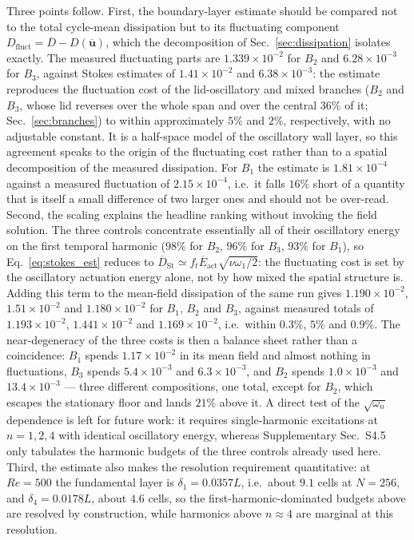 \documentclass[11pt,a4paper]{article}
\newcommand{\Dbar}{\overline{D}}
\begin{document}
Three points follow. First, the boundary-layer estimate should be compared not to
the total cycle-mean dissipation but to its fluctuating component
$D_{\mathrm{fluct}}=\Dbar-D(\overline{\mathbf{u}})$, which the decomposition of
Sec.~\ref{sec:dissipation} isolates exactly. The measured fluctuating parts are
$1.339\times10^{-2}$ for $B_2$ and $6.28\times10^{-3}$ for $B_3$, against Stokes
estimates of $1.41\times10^{-2}$ and $6.38\times10^{-3}$: the estimate reproduces
the fluctuation cost of the lid-oscillatory and mixed branches ($B_2$ and $B_3$,
whose lid reverses over the whole span and over the central $36\%$ of it;
Sec.~\ref{sec:branches}) to within approximately $5\%$ and $2\%$, respectively,
with no adjustable constant. It is a half-space
model of the oscillatory wall layer, so this agreement speaks to the origin of the
fluctuating cost rather than to a spatial decomposition of the measured
dissipation. For $B_1$ the estimate is
$1.81\times10^{-4}$ against a measured fluctuation of $2.15\times10^{-4}$, i.e.\ it
falls $16\%$ short of a quantity that is itself a small difference of two larger
ones and should not be over-read. Second, the scaling
explains the headline ranking without invoking the field solution. The three
controls concentrate essentially all of their oscillatory energy on the first
temporal harmonic ($98\%$ for $B_2$, $96\%$ for $B_3$, $93\%$ for $B_1$), so
Eq.~\eqref{eq:stokes_est} reduces to
$\Dbar_{\mathrm{St}}\simeq f_t\overline{E}_{\mathrm{act}}\sqrt{\nu\omega_1/2}$:
the fluctuating cost is set by the oscillatory actuation energy alone, not by how
mixed the spatial structure is. Adding this term to the mean-field dissipation of
the same run gives $1.190\times10^{-2}$, $1.51\times10^{-2}$ and
$1.180\times10^{-2}$ for $B_1$, $B_2$ and $B_3$, against measured totals of
$1.193\times10^{-2}$, $1.441\times10^{-2}$ and $1.169\times10^{-2}$, i.e.\ within
$0.3\%$, $5\%$ and $0.9\%$. The near-degeneracy of the three costs is then a
balance sheet rather than a coincidence: $B_1$ spends $1.17\times10^{-2}$ in its
mean field and almost nothing in fluctuations, $B_3$ spends $5.4\times10^{-3}$ and
$6.3\times10^{-3}$, and $B_2$ spends $1.0\times10^{-3}$ and $13.4\times10^{-3}$
--- three different compositions, one total, except for $B_2$, which escapes the
stationary floor and lands $21\%$ above it. A direct test of the
$\sqrt{\omega_n}$ dependence is left for future work: it requires single-harmonic
excitations at $n=1,2,4$ with identical oscillatory energy, whereas
Supplementary Sec.~S4.5 only tabulates the harmonic budgets of the three controls
already used here. Third, the estimate also
makes the resolution requirement quantitative: at $Re=500$ the fundamental layer is
$\delta_1=0.0357L$, i.e.\ about $9.1$ cells at $N=256$, and $\delta_4=0.0178L$,
about $4.6$ cells, so the first-harmonic-dominated budgets above are resolved by
construction, while harmonics above $n\approx4$ are marginal at this resolution.
\end{document}
